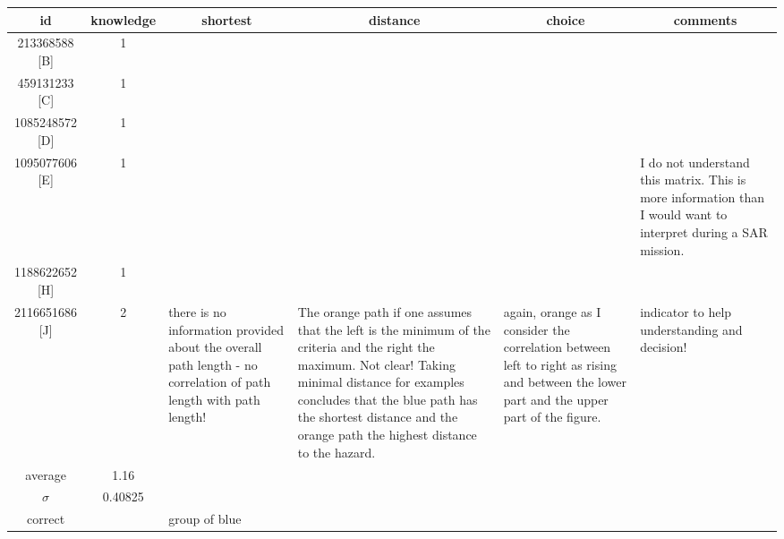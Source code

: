 \documentclass[8pt]{article}
\begin{document}
\begin{longtable}{|c|c|p{4.5cm}|p{4.5cm}|p{4.5cm}|p{4.5cm}|} 
\hline
\multicolumn{1}{|c|}{\textbf{id}} &
\multicolumn{1}{|c|}{\textbf{knowledge}} &
\multicolumn{1}{|c|}{\textbf{shortest}} &
\multicolumn{1}{|c|}{\textbf{distance}} &
\multicolumn{1}{|c|}{\textbf{choice}} &
\multicolumn{1}{|c|}{\textbf{comments}} \\
\hline \hline 
\endfirsthead 
213368588 [B] & 1 &  &  &  &  \\ \hline 
459131233 [C] & 1 &  &  &  &  \\ \hline 
1085248572 [D] & 1 &  &  &  &  \\ \hline 
1095077606 [E] & 1 &  &  &  & I do not understand this matrix. This is more information than I would want to interpret during a SAR mission. \\ \hline 
1188622652 [H] & 1 &  &  &  &  \\ \hline 
2116651686 [J] & 2 & there is no information provided about the overall path length - no correlation of path length with path length! & The orange path if one assumes that the left is the minimum of the criteria and the right the maximum. Not clear! Taking minimal distance for examples concludes that the blue path has the shortest distance and the orange path the highest distance to the hazard. & again, orange as I consider the correlation between left to right as rising and between the lower part and the upper part of the figure.  & indicator to help understanding and decision! \\ \hline \hline
average & 1.16 & & & & \\ \hline
$\sigma$ & 0.40825 & & & & \\ \hline
correct & & group of blue & & & \\ \hline
\end{longtable}

\newpage
%
%
\end{document}
